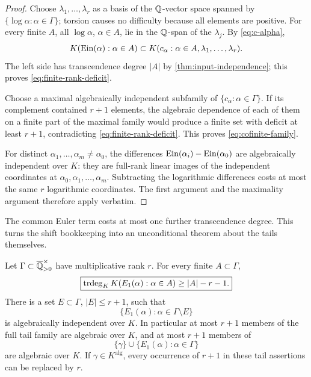 \begin{proof}
Choose \(\lambda_1,\ldots,\lambda_r\) as a basis of the \(\mathbb Q\)-vector space
spanned by \(\{\log\alpha:\alpha\in\Gamma\}\); torsion causes no difficulty
because all elements are positive.  For every finite \(A\), all
\(\log\alpha\), \(\alpha\in A\), lie in the \(\mathbb Q\)-span of the
\(\lambda_j\).  By \eqref{eq:c-alpha},
\[
 K(\operatorname{Ein}(\alpha):\alpha\in A)
 \subset K(c_\alpha:\alpha\in A,\lambda_1,\ldots,\lambda_r).
\]
The left side has transcendence degree \(|A|\) by
\cref{thm:input-independence}; this proves \eqref{eq:finite-rank-deficit}.

Choose a maximal algebraically independent subfamily of
\(\{c_\alpha:\alpha\in\Gamma\}\).  If its complement contained
\(r+1\) elements, the algebraic dependence of each of them on a finite part
of the maximal family would produce a finite set with deficit at least
\(r+1\), contradicting \eqref{eq:finite-rank-deficit}.  This proves
\eqref{eq:cofinite-family}.

For distinct \(\alpha_1,\ldots,\alpha_m\ne\alpha_0\), the differences
\(\operatorname{Ein}(\alpha_i)-\operatorname{Ein}(\alpha_0)\) are algebraically independent over \(K\):
they are full-rank linear images of the independent coordinates at
\(\alpha_0,\alpha_1,\ldots,\alpha_m\).  Subtracting the logarithmic
differences costs at most the same \(r\) logarithmic coordinates.  The first
argument and the maximality argument therefore apply verbatim.
\end{proof}

The common Euler term costs at most one further transcendence degree.  This
turns the shift bookkeeping into an unconditional theorem about the tails
themselves.

\begin{theorem}
\label{thm:E1-cofinite}
Let \(\Gamma\subset\overline{\mathbb Q}_{>0}^{\times}\) have multiplicative rank \(r\).
For every finite \(A\subset\Gamma\),
\begin{equation}\label{eq:E1-finite-rank-defect}
 \boxed{\displaystyle
 \operatorname{trdeg}_KK(E_1(\alpha):\alpha\in A)\ge |A|-r-1.}
\end{equation}
There is a set \(E\subset\Gamma\), \(|E|\le r+1\), such that
\begin{equation}\label{eq:E1-cofinite}
 \{E_1(\alpha):\alpha\in\Gamma\setminus E\}
\end{equation}
is algebraically independent over \(K\).  In particular at most \(r+1\)
members of the full tail family are algebraic over \(K\), and at most
\(r+1\) members of
\[
 \{\gamma\}\cup\{E_1(\alpha):\alpha\in\Gamma\}
\]
are algebraic over \(K\).  If \(\gamma\in K^{\mathrm{alg}}\), every
occurrence of \(r+1\) in these tail assertions can be replaced by \(r\).
\end{theorem}

